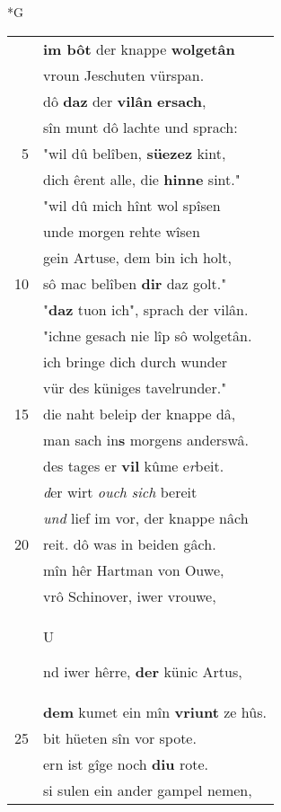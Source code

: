 \documentclass[8pt,a4paper,notitlepage]{article}
\begin{document}
\newpage
\begin{table}[ht]
\begin{minipage}[t]{0.5\linewidth}
\small
\begin{center}*G
\end{center}
\begin{tabular}{rl}
 & \textbf{im bôt} der knappe \textbf{wolgetân}\\ 
 & vroun Jeschuten vürspan.\\ 
 & dô \textbf{daz} der \textbf{vilân} \textbf{ersach},\\ 
 & sîn munt dô lachte und sprach:\\ 
5 & "wil dû belîben, \textbf{süezez} kint,\\ 
 & dich êrent alle, die \textbf{hinne} sint."\\ 
 & "wil dû mich hînt wol spîsen\\ 
 & unde morgen rehte wîsen\\ 
 & gein Artuse, dem bin ich holt,\\ 
10 & sô mac belîben \textbf{dir} daz golt."\\ 
 & "\textbf{daz} tuon ich", sprach der vilân.\\ 
 & "ichne gesach nie lîp sô wolgetân.\\ 
 & ich bringe dich durch wunder\\ 
 & vür des küniges tavelrunder."\\ 
15 & die naht beleip der knappe dâ,\\ 
 & man sach in\textbf{s} morgens anderswâ.\\ 
 & des tages er \textbf{vil} kûme e\textit{r}beit.\\ 
 & \textit{d}er wirt \textit{ouch} \textit{sich} bereit\\ 
 & \textit{und} lief im vor, der knappe nâch\\ 
20 & reit. dô was in beiden gâch.\\ 
 & mîn hêr Hartman von Ouwe,\\ 
 & vrô Schinover, iwer vrouwe,\\ 
 & \begin{large}U\end{large}nd iwer hêrre, \textbf{der} künic Artus,\\ 
 & \textbf{dem} kumet ein mîn \textbf{vriunt} ze hûs.\\ 
25 & bit hüeten sîn vor spote.\\ 
 & ern ist gîge noch \textbf{diu} rote.\\ 
 & si sulen ein ander gampel nemen,\\ 

\end{tabular}
\end{minipage}
\end{table}
\end{document}
